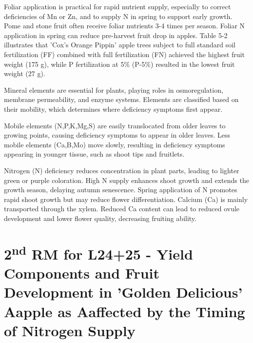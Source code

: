 \vspace{0.5em}
Foliar application is practical for rapid nutrient supply, especially to correct deficiencies of Mn or Zn, and to supply N in spring to support early growth. Pome and stone fruit often receive foliar nutrients 3-4 times per season. Foliar N application in spring can reduce pre-harvest fruit drop in apples. Table 5-2 illustrates that 'Cox's Orange Pippin' apple trees subject to full standard soil fertilization (FF) combined with full fertilization (FN) achieved the highest fruit weight (175 g), while P fertilization at 5\% (P-5\%) resulted in the lowest fruit weight (27 g).

\vspace{0.5em}
Mineral elements are essential for plants, playing roles in osmoregulation, membrane permeability, and enzyme systems. Elements are classified based on their mobility, which determines where deficiency symptoms first appear.

\vspace{0.5em}
Mobile elements (N,P,K,Mg,S) are easily translocated from older leaves to growing points, causing deficiency symptoms to appear in older leaves. Less mobile elements (Ca,B,Mo) move slowly, resulting in deficiency symptoms appearing in younger tissue, such as shoot tips and fruitlets.

\vspace{0.5em}
Nitrogen (N) deficiency reduces concentration in plant parts, leading to lighter green or purple coloration. High N supply enhances shoot growth and extends the growth season, delaying autumn senescence. Spring application of N promotes rapid shoot growth but may reduce flower differentiation. Calcium (Ca) is mainly transported through the xylem. Reduced Ca content can lead to reduced ovule development and lower flower quality, decreasing fruiting ability.


\section{\texorpdfstring{2\textsuperscript{nd} RM for L24+25 - Yield Components and Fruit Development in 'Golden Delicious' Aapple as Aaffected by the Timing of Nitrogen Supply}{2nd RM for L24+25 - Yield Components and Fruit Development in 'Golden Delicious' Aapple as Aaffected by the Timing of Nitrogen Supply}}

